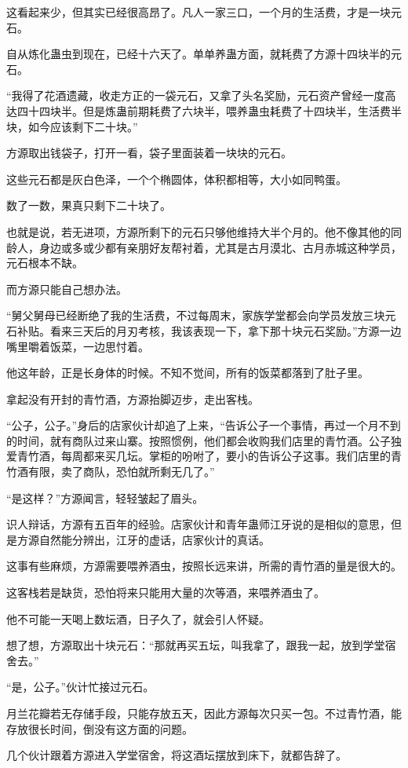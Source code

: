 \begin{this_body}
这看起来少，但其实已经很高昂了。凡人一家三口，一个月的生活费，才是一块元石。

自从炼化蛊虫到现在，已经十六天了。单单养蛊方面，就耗费了方源十四块半的元石。

“我得了花酒遗藏，收走方正的一袋元石，又拿了头名奖励，元石资产曾经一度高达四十四块半。但是炼蛊前期耗费了六块半，喂养蛊虫耗费了十四块半，生活费半块，如今应该剩下二十块。”

方源取出钱袋子，打开一看，袋子里面装着一块块的元石。

这些元石都是灰白色泽，一个个椭圆体，体积都相等，大小如同鸭蛋。

数了一数，果真只剩下二十块了。

也就是说，若无进项，方源所剩下的元石只够他维持大半个月的。他不像其他的同龄人，身边或多或少都有亲朋好友帮衬着，尤其是古月漠北、古月赤城这种学员，元石根本不缺。

而方源只能自己想办法。

“舅父舅母已经断绝了我的生活费，不过每周末，家族学堂都会向学员发放三块元石补贴。看来三天后的月刃考核，我该表现一下，拿下那十块元石奖励。”方源一边嘴里嚼着饭菜，一边思忖着。

他这年龄，正是长身体的时候。不知不觉间，所有的饭菜都落到了肚子里。

拿起没有开封的青竹酒，方源抬脚迈步，走出客栈。

“公子，公子。”身后的店家伙计却追了上来，“告诉公子一个事情，再过一个月不到的时间，就有商队过来山寨。按照惯例，他们都会收购我们店里的青竹酒。公子独爱青竹酒，每周都来买几坛。掌柜的吩咐了，要小的告诉公子这事。我们店里的青竹酒有限，卖了商队，恐怕就所剩无几了。”

“是这样？”方源闻言，轻轻皱起了眉头。

识人辩话，方源有五百年的经验。店家伙计和青年蛊师江牙说的是相似的意思，但是方源自然能分辨出，江牙的虚话，店家伙计的真话。

这事有些麻烦，方源需要喂养酒虫，按照长远来讲，所需的青竹酒的量是很大的。

这客栈若是缺货，恐怕将来只能用大量的次等酒，来喂养酒虫了。

他不可能一天喝上数坛酒，日子久了，就会引人怀疑。

想了想，方源取出十块元石：“那就再买五坛，叫我拿了，跟我一起，放到学堂宿舍去。”

“是，公子。”伙计忙接过元石。

月兰花瓣若无存储手段，只能存放五天，因此方源每次只买一包。不过青竹酒，能存放很长时间，倒没有这方面的问题。

几个伙计跟着方源进入学堂宿舍，将这酒坛摆放到床下，就都告辞了。


\end{this_body}
